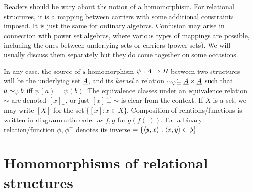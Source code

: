 \documentclass[10pt]{article}
\begin{document}

Readers should be wary about the notion of a homomorphism.
For relational structures,
it is a mapping between carriers with some additional
constraints imposed. It is just the same for ordinary
algebras. Confusion may arise in connection with 
power set algebras, where various types of mappings are possible,
including the ones between underlying sets or carriers (power
sets). We will usually discuss them separately but they do come
together on some occasions. 

In any case, the source of a homomorphism $\psi :
A \rightarrow B$ between two structures will be the underlying set $\underline {A}$,
and its {\em kernel\/}  a relation
$\sim_\psi \subseteq \underline {A}\times\underline {A}$ 
such that
$a\sim_\psi b$ iff $\psi(a)=\psi(b)$. The equivalence classes under
an equivalence relation $\sim$ are denoted $[x]_\sim$, or just $[x]$ if 
$\sim$ is clear from the context. If $X$ is a set, we may write $[X]$
for the set $\{[x]:x\in X\}$. 
Composition of relations/functions is written in diagrammatic order
as $f;g$ for $g(f(\_))$. For a binary relation/function $\phi$, $\phi^-$
 denotes its inverse $=\{\langle y,x\rangle:\langle x,y\rangle\in\phi\}$



\section{Homomorphisms of relational structures}
\label{se:comp}
\end{document}

